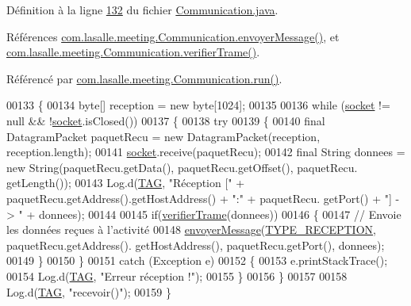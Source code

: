 Définition à la ligne \hyperlink{_communication_8java_source_l00132}{132} du fichier \hyperlink{_communication_8java_source}{Communication.\+java}.



Références \hyperlink{_communication_8java_source_l00161}{com.\+lasalle.\+meeting.\+Communication.\+envoyer\+Message()}, et \hyperlink{_communication_8java_source_l00273}{com.\+lasalle.\+meeting.\+Communication.\+verifier\+Trame()}.



Référencé par \hyperlink{_communication_8java_source_l00296}{com.\+lasalle.\+meeting.\+Communication.\+run()}.


\begin{DoxyCode}
00133     \{
00134         byte[] reception = \textcolor{keyword}{new} byte[1024];
00135 
00136         \textcolor{keywordflow}{while} (\hyperlink{classcom_1_1lasalle_1_1meeting_1_1_communication_a2a538f36640aecebbb833bbaf1f03858}{socket} != null && !\hyperlink{classcom_1_1lasalle_1_1meeting_1_1_communication_a2a538f36640aecebbb833bbaf1f03858}{socket}.isClosed())
00137         \{
00138             \textcolor{keywordflow}{try}
00139             \{
00140                 \textcolor{keyword}{final} DatagramPacket paquetRecu = \textcolor{keyword}{new} DatagramPacket(reception, reception.length);
00141                 \hyperlink{classcom_1_1lasalle_1_1meeting_1_1_communication_a2a538f36640aecebbb833bbaf1f03858}{socket}.receive(paquetRecu);
00142                 \textcolor{keyword}{final} String donnees = \textcolor{keyword}{new} String(paquetRecu.getData(), paquetRecu.getOffset(), paquetRecu.
      getLength());
00143                 Log.d(\hyperlink{classcom_1_1lasalle_1_1meeting_1_1_communication_a5d58f88df1f20b4d61edbed9a82eccab}{TAG}, \textcolor{stringliteral}{"Réception ["} + paquetRecu.getAddress().getHostAddress() + \textcolor{stringliteral}{":"} + paquetRecu.
      getPort() + \textcolor{stringliteral}{"] -> "} + donnees);
00144 
00145                 \textcolor{keywordflow}{if}(\hyperlink{classcom_1_1lasalle_1_1meeting_1_1_communication_af3090814ffb2fc9537961be52ebd17c2}{verifierTrame}(donnees))
00146                 \{
00147                     \textcolor{comment}{// Envoie les données reçues à l'activité}
00148                     \hyperlink{classcom_1_1lasalle_1_1meeting_1_1_communication_a7fa206969cf5dc48f4660845bbff0fc1}{envoyerMessage}(\hyperlink{classcom_1_1lasalle_1_1meeting_1_1_communication_a4997d801f57344fb4eea7924903c2d6c}{TYPE\_RECEPTION}, paquetRecu.getAddress().
      getHostAddress(), paquetRecu.getPort(), donnees);
00149                 \}
00150             \}
00151             \textcolor{keywordflow}{catch} (Exception e)
00152             \{
00153                 e.printStackTrace();
00154                 Log.d(\hyperlink{classcom_1_1lasalle_1_1meeting_1_1_communication_a5d58f88df1f20b4d61edbed9a82eccab}{TAG}, \textcolor{stringliteral}{"Erreur réception !"});
00155             \}
00156         \}
00157 
00158         Log.d(\hyperlink{classcom_1_1lasalle_1_1meeting_1_1_communication_a5d58f88df1f20b4d61edbed9a82eccab}{TAG}, \textcolor{stringliteral}{"recevoir()"});
00159     \}
\end{DoxyCode}
